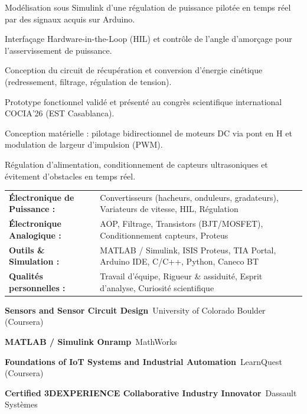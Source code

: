 \documentclass[10pt,a4paper]{../altacv}
\begin{document}
\begin{cvitems}
  \item Modélisation sous Simulink d’une régulation de puissance pilotée en temps réel par des signaux acquis sur Arduino.
  \item Interfaçage Hardware-in-the-Loop (HIL) et contrôle de l’angle d’amorçage pour l’asservissement de puissance.
\end{cvitems}
\vspace{2pt}
\begin{cvitems}
  \item Conception du circuit de récupération et conversion d’énergie cinétique (redressement, filtrage, régulation de tension).
  \item Prototype fonctionnel validé et présenté au congrès scientifique international COCIA’26 (EST Casablanca).
\end{cvitems}
\vspace{2pt}
\begin{cvitems}
  \item Conception matérielle : pilotage bidirectionnel de moteurs DC via pont en H et modulation de largeur d’impulsion (PWM).
  \item Régulation d’alimentation, conditionnement de capteurs ultrasoniques et évitement d’obstacles en temps réel.
\end{cvitems}

{\small
\begin{tabular}{@{}ll@{}}
\textbf{Électronique de Puissance :} & Convertisseurs (hacheurs, onduleurs, gradateurs), Variateurs de vitesse, HIL, Régulation \\[1.5pt]
\textbf{Électronique Analogique :} & AOP, Filtrage, Transistors (BJT/MOSFET), Conditionnement capteurs, Proteus \\[1.5pt]
\textbf{Outils \& Simulation :} & MATLAB / Simulink, ISIS Proteus, TIA Portal, Arduino IDE, C/C++, Python, Caneco BT \\[1.5pt]
\textbf{Qualités personnelles :} & Travail d’équipe, Rigueur \& assiduité, Esprit d’analyse, Curiosité scientifique
\end{tabular}
}

\begin{cvitems}
  \item \textbf{Sensors and Sensor Circuit Design}~\hfill {\color{emphasis}University of Colorado Boulder (Coursera)}
  \item \textbf{MATLAB / Simulink Onramp}~\hfill {\color{emphasis}MathWorks}
  \item \textbf{Foundations of IoT Systems and Industrial Automation}~\hfill {\color{emphasis}LearnQuest (Coursera)}
  \item \textbf{Certified 3DEXPERIENCE Collaborative Industry Innovator}~\hfill {\color{emphasis}Dassault Systèmes}
\end{cvitems}

\cvactivites
\cvlangues
\end{document}
